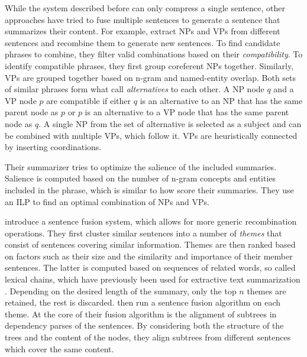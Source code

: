 \documentclass[a4paper,BCOR=10mm]{report}
\numberwithin{lemma}{chapter}
\numberwithin{definition}{chapter}
\begin{document}
While the system described before can only compress a single sentence, other approaches have tried to fuse multiple sentences to generate a sentence that summarizes their content.
For example, \citet{bing} extract NPs and VPs from different sentences and recombine them to generate new sentences.
To find candidate phrases to combine, they filter valid combinations based on their \textit{compatibility}. To identify compatible phrases, they first group coreferent NPs together. Similarly, VPs are grouped together based on n-gram and named-entity overlap. Both sets of similar phrases form what \citeauthor{bing} call \textit{alternatives} to each other. A NP node $q$ and a VP node $p$ are compatible if either $q$ is an alternative to an NP that has the same parent node as $p$ or $p$ is an alternative to a VP node that has the same parent node as $q$. A single NP from the set of alternative is selected as a subject and can be combined with multiple VPs, which follow it. VPs are heuristically connected by inserting coordinations.

Their summarizer tries to optimize the salience of the included summaries. Salience is computed based on the number of n-gram concepts and entities included in the phrase, which is similar to how \citet{berg-kirkpatrick} score their summaries.
They use an ILP to find an optimal combination of NPs and VPs.

\citet{barzilay+mckeown} introduce a sentence fusion system, which allows for more generic recombination operations. They first cluster similar sentences into a number of \textit{themes} that consist of sentences covering similar information.
Themes are then ranked based on factors such as their size and the similarity and importance of their member sentences. The latter is computed based on sequences of related words, so called lexical chains, which have previously been used for extractive text summarization \citep{lexical-chains}. Depending on the desired length of the summary, only the top $n$ themes are retained, the rest is discarded.
\citeauthor{barzilay+mckeown} then run a sentence fusion algorithm on each theme.
At the core of their fusion algorithm is the alignment of subtrees in dependency parses of the sentences.
By considering both the structure of the trees and the content of the nodes, they align subtrees from different sentences which cover the same content.
\end{document}
